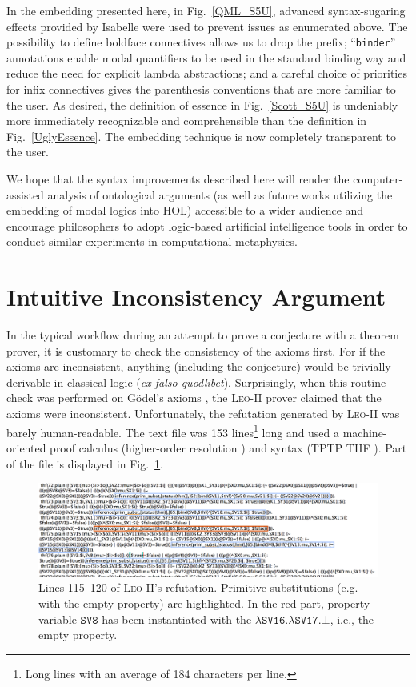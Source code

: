 \documentclass{article}
\begin{document}
In the embedding presented here, in Fig.~\ref{QML_S5U}, advanced
syntax-sugaring effects provided by Isabelle were used to prevent
issues as enumerated above. The possibility to define boldface connectives allows us to drop the prefix; ``\texttt{binder}'' annotations enable modal quantifiers to be used in the standard binding way and reduce the need for explicit lambda abstractions; and a careful choice of priorities for infix connectives gives the parenthesis conventions that are more familiar to the user. As desired, the definition of essence in Fig.~\ref{Scott_S5U} is undeniably more immediately recognizable and comprehensible than the definition in Fig.~\ref{UglyEssence}. The embedding technique is now completely transparent to the user.

We hope that the syntax improvements described here will render the computer-assisted analysis of ontological arguments (as well as future works utilizing the embedding of modal logics into HOL) accessible to a wider audience and encourage philosophers to adopt logic-based artificial intelligence tools in order to conduct similar experiments in computational metaphysics.


\section{Intuitive Inconsistency Argument} \label{sec:inconsistency}

In the typical workflow during an attempt to prove a conjecture with a theorem prover, it is customary to check the consistency of the axioms first. For if the axioms are inconsistent, anything (including the conjecture) would be trivially derivable in classical logic (\emph{ex falso quodlibet}). Surprisingly, when this routine check was performed on G\"odel's axioms \cite{C40}, the \textsc{Leo-II} prover claimed that the axioms were inconsistent. Unfortunately, the refutation generated by \textsc{Leo-II} was barely human-readable. The text file was 153 lines\footnote{Long lines with an average of 184 characters per line.} long and used a machine-oriented proof calculus (higher-order resolution \cite{W47}) and syntax (TPTP THF \cite{J22}). Part of the file is displayed in Fig.~\ref{LEO-Proof}.

\begin{figure}
\centerline{\includegraphics[width=\textwidth]{./Images/LEO-Proof.png}}
\caption{Lines 115--120 of \textsc{Leo-II}'s refutation. Primitive
  substitutions (e.g. with the empty property) are highlighted. In the
red part, property variable $\texttt{SV8}$ has been instantiated with the
$\lambda \texttt{SV16}. \lambda \texttt{SV17}. \bot$, i.e., the empty property.
} \label{LEO-Proof}
\end{figure}
\end{document}
